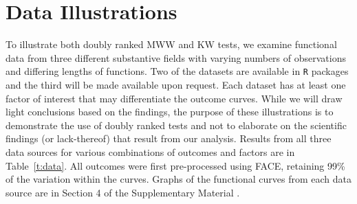 \documentclass[12pt]{article}
\theoremstyle{plain}
\begin{document}

\section{Data Illustrations}
\label{s:app}

To illustrate both doubly ranked MWW and KW tests, we examine functional data from three different substantive fields with varying numbers of observations and differing lengths of functions. Two of the datasets are available in \texttt{R} packages and the third will be made available upon request. Each dataset has at least one factor of interest that may differentiate the outcome curves. While we will draw light conclusions based on the findings, the purpose of these illustrations is to demonstrate the use of doubly ranked tests and not to elaborate on the scientific findings (or lack-thereof) that result from our analysis. Results from all three data sources for various combinations of outcomes and factors are in Table~\ref{t:data}. All outcomes were first pre-processed using FACE, retaining 99\% of the variation within the curves. Graphs of the functional curves from each data source are in Section 4 of the Supplementary Material \citep{DRTSup2023}.
\end{document}
